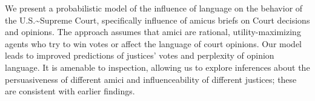 We present a probabilistic model of the influence of language on the behavior of the U.S.{\textasciitilde}Supreme Court, specifically influence of amicus briefs on Court decisions and opinions. The approach assumes that amici are rational, utility-maximizing agents who try to win votes or affect the language of court opinions.  Our model leads to improved predictions of justices' votes and perplexity of opinion language. It is amenable to inspection, allowing us to explore inferences about the persuasiveness of different amici and influenceability of different justices; these are consistent with earlier findings.
